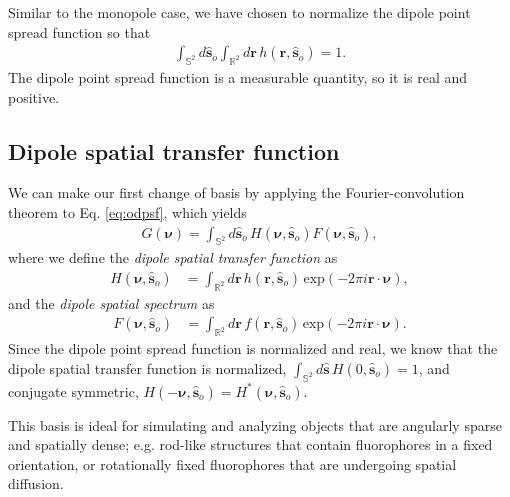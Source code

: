 \documentclass[]{osa-article}
\providecommand{\mb}[1]{\mathbf{#1}}
\providecommand{\so}{\mathbf{\hat{s}}_o}
\providecommand{\mh}[1]{\mathbf{\hat{#1}}}
\providecommand{\mbb}[1]{\mathbb{#1}}
\providecommand{\bs}[1]{\boldsymbol{#1}}
\providecommand{\bv}{\bs{\nu}}
\begin{document}
Similar to the monopole case, we have chosen to normalize the dipole point
spread function so that
\begin{align}
  \int_{\mbb{S}^2}d\so\int_{\mbb{R}^2}d\mb{r}\, h(\mb{r}, \so) = 1. 
\end{align}
The dipole point spread function is a measurable quantity, so it is real
and positive.

\subsection{Dipole spatial transfer function}
We can make our first change of basis by applying the Fourier-convolution
theorem to Eq. \eqref{eq:odpsf}, which yields
\begin{align}
G(\bv) = \int_{\mbb{S}^2}d\so\, H(\bv, \so)F(\bv, \so) \label{eq:odotf},
\end{align}
where we define the \textit{dipole spatial transfer function} as
  \begin{align}
  H(\bv, \so) &= \int_{\mbb{R}^2}d\mb{r}\, h(\mb{r}, \so)\, \text{exp}(-2\pi i\mb{r}\cdot\bv),\label{eq:dstf}
  \end{align}
  and the \textit{dipole spatial spectrum} as
  \begin{align}
  F(\bv, \so) &= \int_{\mbb{R}^2}d\mb{r}\, f(\mb{r}, \so)\, \text{exp}(-2\pi i\mb{r}\cdot\bv). 
  \end{align}
  Since the dipole point spread function is normalized and real, we know that
  the dipole spatial transfer function is normalized,
  $\int_{\mbb{S}^2}d\mh{s}\, H(0, \so) = 1$, and conjugate symmetric,
  $H(-\bv, \so) = H^*(\bv, \so)$.
  
  This basis is ideal for simulating and analyzing objects that are angularly
  sparse and spatially dense; e.g. rod-like structures that contain fluorophores
  in a fixed orientation, or rotationally fixed fluorophores that are undergoing
  spatial diffusion.
\end{document}
